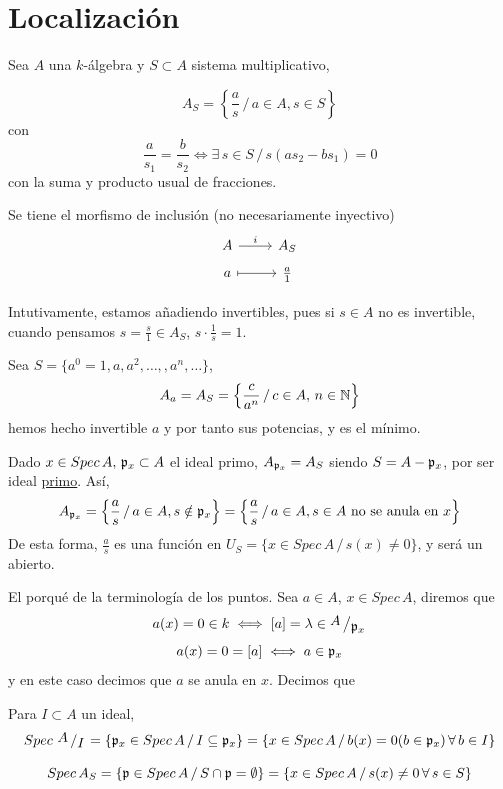 \section{Localizaci\'on}
Sea $A$ una $k$-\'algebra y $S \subset A$ sistema multiplicativo,\begin{defi}
    $$A_S = \left\{\frac{a}{s} \, / \, a\in A, s\in S \right\}$$
    con 
    $$\frac{a}{s_1} = \frac{b}{s_2} \iff \exists \, s\in S \, / \, s(as_2 - bs_1) = 0$$
    con la suma y producto usual de fracciones.
\end{defi}
\begin{obs}
    Se tiene el morfismo de inclusi\'on (no necesariamente inyectivo)
    $$\bt A \rar{i} & A_S \\[-5mm] a \rarmaps & \frac{a}{1} \et$$

    Intutivamente, estamos añadiendo invertibles, pues si $s \in A$ no es invertible, cuando pensamos $s = \frac{s}{1} \in A_S$, $s\cdot \frac{1}{s} = 1$.
\end{obs}
\begin{ejem}
Sea $S=\{a^0=1, a, a^2,\ldots, , a^n , \ldots\}$, 
$$A_a = A_S = \left\{ \frac{c}{a^n} \, / \, c\in A, \, n\in \mathbb{N} \right\}$$
hemos hecho invertible $a$ y por tanto sus potencias, y es el m\'inimo.
\end{ejem}
\begin{ejem}
    Dado $x\in Spec\, A, \, \mathfrak{p}_x\subset A$ el ideal primo, $A_{\mathfrak{p}_x}=A_S$ siendo $S=A-\mathfrak{p}_x$, por ser ideal \underline{primo}. As\'i, 
    $$A_{\mathfrak{p}_x} = \left\{ \frac{a}{s} \, /\, a\in A, s\notin \mathfrak{p}_x \right\} = \left\{ \frac{a}{s} \, /\, a\in A, s\in A \text{ no se anula en } x \right\}$$
    De esta forma, $\frac{a}{s}$ es una funci\'on en $U_S = \{x\in Spec\, A\, /\, s(x) \neq 0\}$, y ser\'a un abierto. 
\end{ejem}
\begin{obs}
    El porqu\'e de la terminolog\'ia de los puntos. Sea $a\in A$, $x\in Spec\, A$, diremos que $$a(x) = 0 \in k \iff [a] = \lambda \in \modulo{A}{\p_x}$$
    $$a(x) = 0 =[a] \iff a\in \mathfrak{p}_x$$
    y en este caso decimos que $a$ se anula en $x$. Decimos que  
\end{obs}
\begin{ejem}
    Para $I \subset A$ un ideal, 
    $$Spec\, \, \modulo{A}{I} = \{\p_x\in Spec\, A \, / \, I \subseteq \p_x\} = \{ x\in Spec\, A \, /\, b(x) = 0 (b\in \p_x) \, \forall \, b\in I\} $$
\end{ejem}
\begin{prop}
    $$Spec\, A_S = \{ \mathfrak{p}\in Spec\, A \, /\, S\cap \mathfrak{p} = \emptyset \} = \{x\in Spec\, A \, / \, s(x) \neq 0 \, \forall \, s\in S\}$$
\end{prop}
